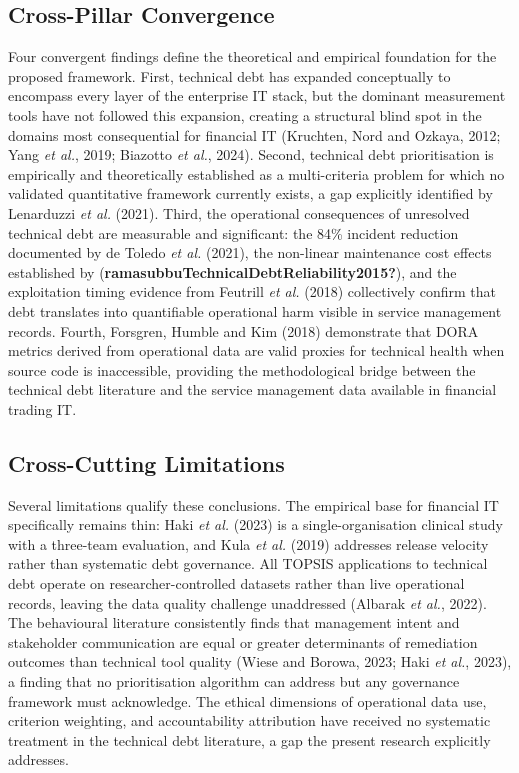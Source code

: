 \documentclass[
  british,
  12pt,
  a4paper,
]{report}
\begin{document}
\subsection{Cross-Pillar Convergence}\label{cross-pillar-convergence}

Four convergent findings define the theoretical and empirical foundation
for the proposed framework. First, technical debt has expanded
conceptually to encompass every layer of the enterprise IT stack, but
the dominant measurement tools have not followed this expansion,
creating a structural blind spot in the domains most consequential for
financial IT (Kruchten, Nord and Ozkaya, 2012; Yang \emph{et al.}, 2019;
Biazotto \emph{et al.}, 2024). Second, technical debt prioritisation is
empirically and theoretically established as a multi-criteria problem
for which no validated quantitative framework currently exists, a gap
explicitly identified by Lenarduzzi \emph{et al.} (2021). Third, the
operational consequences of unresolved technical debt are measurable and
significant: the 84\% incident reduction documented by de Toledo
\emph{et al.} (2021), the non-linear maintenance cost effects
established by (\textbf{ramasubbuTechnicalDebtReliability2015?}), and
the exploitation timing evidence from Feutrill \emph{et al.} (2018)
collectively confirm that debt translates into quantifiable operational
harm visible in service management records. Fourth, Forsgren, Humble and
Kim (2018) demonstrate that DORA metrics derived from operational data
are valid proxies for technical health when source code is inaccessible,
providing the methodological bridge between the technical debt
literature and the service management data available in financial
trading IT.

\subsection{Cross-Cutting Limitations}\label{cross-cutting-limitations}

Several limitations qualify these conclusions. The empirical base for
financial IT specifically remains thin: Haki \emph{et al.} (2023) is a
single-organisation clinical study with a three-team evaluation, and
Kula \emph{et al.} (2019) addresses release velocity rather than
systematic debt governance. All TOPSIS applications to technical debt
operate on researcher-controlled datasets rather than live operational
records, leaving the data quality challenge unaddressed (Albarak
\emph{et al.}, 2022). The behavioural literature consistently finds that
management intent and stakeholder communication are equal or greater
determinants of remediation outcomes than technical tool quality (Wiese
and Borowa, 2023; Haki \emph{et al.}, 2023), a finding that no
prioritisation algorithm can address but any governance framework must
acknowledge. The ethical dimensions of operational data use, criterion
weighting, and accountability attribution have received no systematic
treatment in the technical debt literature, a gap the present research
explicitly addresses.
\end{document}
